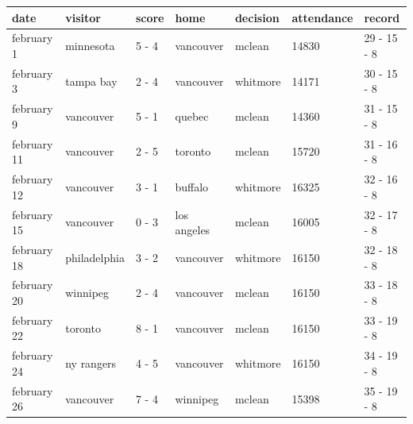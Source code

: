 \documentclass{article}
\begin{document}
\begin{tabular}{lllllll}
\toprule
date & visitor & score & home & decision & attendance & record \\
\midrule
february 1 & minnesota & 5 - 4 & vancouver & mclean & 14830 & 29 - 15 - 8 \\
february 3 & tampa bay & 2 - 4 & vancouver & whitmore & 14171 & 30 - 15 - 8 \\
february 9 & vancouver & 5 - 1 & quebec & mclean & 14360 & 31 - 15 - 8 \\
february 11 & vancouver & 2 - 5 & toronto & mclean & 15720 & 31 - 16 - 8 \\
february 12 & vancouver & 3 - 1 & buffalo & whitmore & 16325 & 32 - 16 - 8 \\
february 15 & vancouver & 0 - 3 & los angeles & mclean & 16005 & 32 - 17 - 8 \\
february 18 & philadelphia & 3 - 2 & vancouver & whitmore & 16150 & 32 - 18 - 8 \\
february 20 & winnipeg & 2 - 4 & vancouver & mclean & 16150 & 33 - 18 - 8 \\
february 22 & toronto & 8 - 1 & vancouver & mclean & 16150 & 33 - 19 - 8 \\
february 24 & ny rangers & 4 - 5 & vancouver & whitmore & 16150 & 34 - 19 - 8 \\
february 26 & vancouver & 7 - 4 & winnipeg & mclean & 15398 & 35 - 19 - 8 \\
\bottomrule
\end{tabular}
\end{document}
